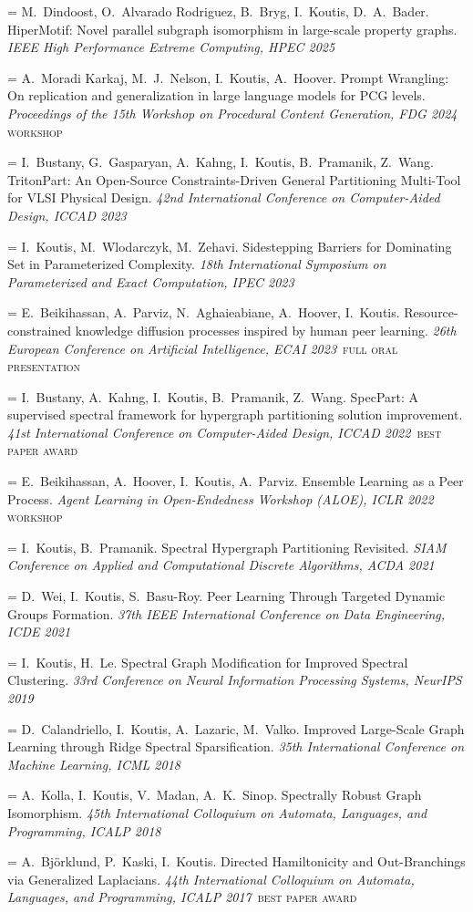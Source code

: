 \documentclass[11pt,letterpaper]{article}
\newlength{\datecol}\setlength{\datecol}{1.06in}
\newlength{\entrysep}\setlength{\entrysep}{4pt}
\newcommand{\datefont}{\small\color{muted}}
\newcommand{\badge}[1]{\,{\setlength{\fboxsep}{1.4pt}%
  \colorbox{accentlight}{\textcolor{accent}{\footnotesize\textsc{#1}}}}}
\newcommand{\graybadge}[1]{\,{\setlength{\fboxsep}{1.4pt}%
  \colorbox{grayfill}{\textcolor{muted}{\footnotesize\textsc{#1}}}}}
\newcommand{\me}{I.~Koutis}
\newcommand{\pub}[4]{\par\addvspace{\entrysep}\noindent\hangindent=\datecol\hangafter=1
  \makebox[\datecol][l]{\datefont [#1]}#2. #3. \textit{#4}}
\begin{document}
\pub{31}{M.~Dindoost, O.~Alvarado Rodriguez, B.~Bryg, \me, D.~A.~Bader}
  {HiperMotif: Novel parallel subgraph isomorphism in large-scale property graphs}
  {IEEE High Performance Extreme Computing, HPEC 2025}
\pub{30}{A.~Moradi Karkaj, M.~J.~Nelson, \me, A.~Hoover}
  {Prompt Wrangling: On replication and generalization in large language models for PCG levels}
  {Proceedings of the 15th Workshop on Procedural Content Generation, FDG 2024}\graybadge{workshop}
\pub{29}{I.~Bustany, G.~Gasparyan, A.~Kahng, \me, B.~Pramanik, Z.~Wang}
  {TritonPart: An Open-Source Constraints-Driven General Partitioning Multi-Tool for VLSI Physical Design}
  {42nd International Conference on Computer-Aided Design, ICCAD 2023}
\pub{28}{\me, M.~Wlodarczyk, M.~Zehavi}
  {Sidestepping Barriers for Dominating Set in Parameterized Complexity}
  {18th International Symposium on Parameterized and Exact Computation, IPEC 2023}
\pub{27}{E.~Beikihassan, A.~Parviz, N.~Aghaieabiane, A.~Hoover, \me}
  {Resource-constrained knowledge diffusion processes inspired by human peer learning}
  {26th European Conference on Artificial Intelligence, ECAI 2023}\badge{full oral presentation}
\pub{26}{I.~Bustany, A.~Kahng, \me, B.~Pramanik, Z.~Wang}
  {SpecPart: A supervised spectral framework for hypergraph partitioning solution improvement}
  {41st International Conference on Computer-Aided Design, ICCAD 2022}\badge{best paper award}
\pub{25}{E.~Beikihassan, A.~Hoover, \me, A.~Parviz}
  {Ensemble Learning as a Peer Process}
  {Agent Learning in Open-Endedness Workshop (ALOE), ICLR 2022}\graybadge{workshop}
\pub{24}{\me, B.~Pramanik}
  {Spectral Hypergraph Partitioning Revisited}
  {SIAM Conference on Applied and Computational Discrete Algorithms, ACDA 2021}
\pub{23}{D.~Wei, \me, S.~Basu-Roy}
  {Peer Learning Through Targeted Dynamic Groups Formation}
  {37th IEEE International Conference on Data Engineering, ICDE 2021}
\pub{22}{\me, H.~Le}
  {Spectral Graph Modification for Improved Spectral Clustering}
  {33rd Conference on Neural Information Processing Systems, NeurIPS 2019}
\pub{21}{D.~Calandriello, \me, A.~Lazaric, M.~Valko}
  {Improved Large-Scale Graph Learning through Ridge Spectral Sparsification}
  {35th International Conference on Machine Learning, ICML 2018}
\pub{20}{A.~Kolla, \me, V.~Madan, A.~K.~Sinop}
  {Spectrally Robust Graph Isomorphism}
  {45th International Colloquium on Automata, Languages, and Programming, ICALP 2018}
\pub{19}{A.~Björklund, P.~Kaski, \me}
  {Directed Hamiltonicity and Out-Branchings via Generalized Laplacians}
  {44th International Colloquium on Automata, Languages, and Programming, ICALP 2017}\badge{best paper award}
\end{document}
